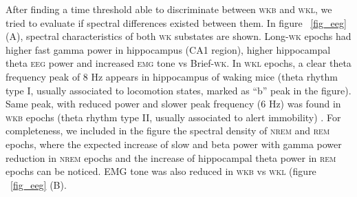 \documentclass[10pt,letterpaper]{article}
\def\EMG/{\textsc{emg}}
\def\EEG/{\textsc{eeg}}
\def\REM/{\textsc{rem}}
\def\NREM/{\textsc{nrem}}
\def\WK/{\textsc{wk}}
\def\WKL/{\textsc{wkl}}
\def\WKB/{\textsc{wkb}}
\def\EEG/{\textsc{eeg}}
\def\EMG/{\textsc{emg}}
\begin{document}
After finding a time threshold able to discriminate between \WKB/ and \WKL/, we tried to evaluate if spectral differences existed between them. In figure ~\ref{fig_eeg} (A), spectral characteristics of both \WK/ substates are shown.  Long-\WK/ epochs had  higher fast gamma power in hippocampus (CA1 region), higher hippocampal theta \EEG/ power and increased \EMG/ tone vs Brief-\WK/. In \WKL/ epochs,  a clear theta frequency peak  of 8 Hz appears  in hippocampus of waking mice (theta rhythm type I, usually associated to locomotion states, marked as ``b'' peak in the figure). Same peak, with reduced power and slower peak frequency (6 Hz) was found in \WKB/ epochs (theta rhythm type II, usually associated to alert immobility) \cite{gangadharan2016medial}. For completeness, we included in the figure the spectral density of \NREM/ and \REM/ epochs, where the expected increase of slow and beta power with gamma power reduction in \NREM/ epochs and the increase of hippocampal theta power in \REM/ epochs can be noticed. EMG tone was also reduced in \WKB/ vs  \WKL/ (figure ~\ref{fig_eeg} (B). 

\end{document}
